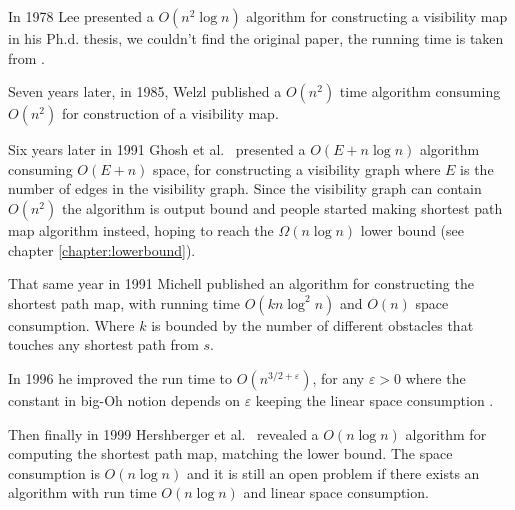 In 1978 Lee presented a $O(n^2\log n)$ algorithm for constructing a visibility
map in his Ph.d.  thesis\cite{LEE78}, we couldn't find the original paper, the
running time is taken from \cite{HershbergerS99}. 

Seven years later, in 1985, Welzl \cite{DBLP:journals/ipl/Welzl85} published a
$O(n^2)$ time algorithm consuming $O(n^2)$ for construction of a visibility
map.  

Six years later in 1991 Ghosh et al.\ \cite{GhoshM91} presented a $O(E+n\log n)$
algorithm consuming $O(E+n)$ space, for constructing a visibility graph where
$E$ is the number of edges in the visibility graph.
Since the visibility graph can contain $O(n^2)$ the algorithm is output bound
and people started making shortest path map algorithm insteed, hoping to reach
the $\Omega{(n\log n)}$ lower bound (see chapter \ref{chapter:lowerbound}).

That same year in 1991 Michell \cite{DBLP:journals/amai/Mitchell91} published
an algorithm for constructing the shortest path map, with running time
$O(kn\log^2 n)$ and $O(n)$ space consumption. Where $k$ is bounded by the
number of different obstacles that touches any shortest path from $s$.

In 1996 he improved the run time to $O(n^{3/2+\varepsilon})$, for any
$\varepsilon>0$ where the constant in big-Oh notion depends on $\varepsilon$
keeping the linear space consumption  \cite{DBLP:journals/ijcga/Mitchell96}.

Then finally in 1999 Hershberger et al.\ \cite{HershbergerS99} revealed a
$O(n\log n)$ algorithm for computing the shortest path map, matching the lower
bound. The space consumption is $O(n\log n)$ and it is still an open problem if
there exists an algorithm with run time $O(n\log n)$ and linear space
consumption.


